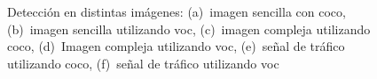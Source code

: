 \begin{figure}[H]
	\centering
	 \hspace{10pt}
	 \hspace{10pt}
	 \hspace{10pt}
	\caption{Detección en distintas imágenes: (a)~imagen sencilla con \acrshort{coco}, (b)~imagen sencilla utilizando \acrshort{voc}, (c)~imagen compleja utilizando \acrshort{coco}, (d)~Imagen compleja utilizando \acrshort{voc}, (e)~señal de tráfico utilizando \acrshort{coco}, (f)~señal de tráfico utilizando \acrshort{voc}}
	\label{fig.ssd1}
\end{figure}

